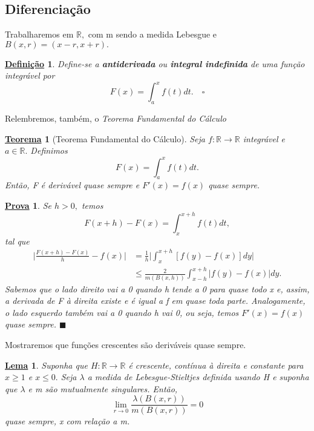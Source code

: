 \documentclass{article}
\newtheorem*{def*}{\underline{Defini\c c\~ao}}
\newtheorem*{theorem*}{\underline{Teorema}}
\newtheorem*{lemma*}{\underline{Lema}}
\newtheorem*{proof*}{\underline{Prova}}
\renewcommand\qedsymbol{$\blacksquare$}
\begin{document}
\subsection{Diferenciação} 
  Trabalharemos em \(\mathbb{R},\) com m sendo a medida Lebesgue e \(B(x, r) = (x-r, x+r).\)
 \begin{def*}
   Define-se a \textbf{antiderivada} ou \textbf{integral indefinida} de uma função integrável por 
     \[
       F(x) = \int_{a}^{x}f(t)dt.\quad \square
     \]
 \end{def*}
 Relembremos, também, o \textit{Teorema Fundamental do Cálculo} 
 \hypertarget{calculus}{\begin{theorem*}[Teorema Fundamental do Cálculo]
    Seja \(f:\mathbb{R}\rightarrow \mathbb{R}\) integrável e \(a\in \mathbb{R}.\) Definimos 
      \[
        F(x) = \int_{a}^{x}f(t)dt.
      \]
   Então, F é derivável quase sempre e \(F'(x) = f(x)\) quase sempre.
  \end{theorem*}}
 \begin{proof*}
   Se \(h > 0,\) temos 
     \[
       F(x+h) - F(x) = \int_{x}^{x+h}f(t)dt,
     \]
  tal que 
 \begin{align*}
   \biggl\vert \frac{F(x+h) - F(x)}{h} - f(x) \biggr\vert &= \frac{1}{h}\biggl\vert \int_{x}^{x+h}[f(y) - f(x)]dy \biggr\vert\\ 
                                                          &\leq \frac{2}{m(B(x, h))}\int_{x-h}^{x+h}|f(y) - f(x)|dy.
 \end{align*}
  Sabemos que o lado direito vai a 0 quando h tende a 0 para quase todo x e, assim, a derivada de F à direita existe e é igual a f em quase toda parte. Analogamente, o lado esquerdo também vai a 0 quando h vai 0, ou seja, temos 
  \(F'(x) = f(x)\) quase sempre. \qedsymbol
 \end{proof*}
  Mostraremos que funções crescentes são deriváveis quase sempre. 
 \begin{lemma*}
   Suponha que \(H:\mathbb{R}\rightarrow \mathbb{R}\) é crescente, contínua à direita e constante para \(x\geq 1\) e \(x\leq 0.\) Seja \(\lambda \) a medida de Lebesgue-Stieltjes definida usando H e suponha que \(\lambda \) e m são mutualmente singulares. Então,
     \[
       \lim_{r\to 0}\frac{\lambda (B(x, r))}{m(B(x, r))} = 0
     \]
    quase sempre, x com relação a m.
 \end{lemma*}
\end{document}
